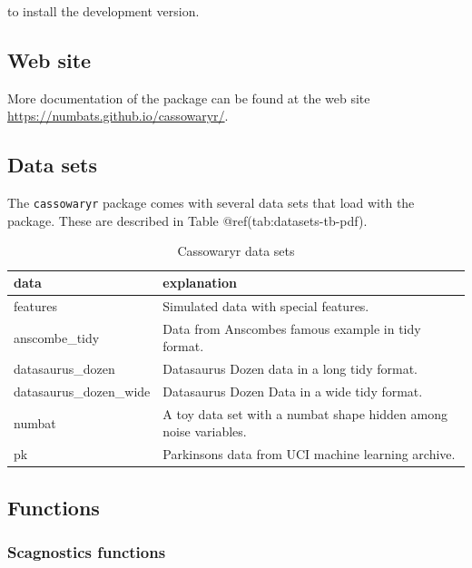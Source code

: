 to install the development version.

\hypertarget{web-site}{%
\subsection{Web site}\label{web-site}}

More documentation of the package can be found at the web site
\url{https://numbats.github.io/cassowaryr/}.

\hypertarget{data-sets}{%
\subsection{Data sets}\label{data-sets}}

The \texttt{cassowaryr} package comes with several data sets that load
with the package. These are described in Table
@ref(tab:datasets-tb-pdf).

\begin{Schunk}
\begin{table}

\caption{\label{tab:datasets-tb-pdf}Cassowaryr data sets}
\centering
\begin{tabular}[t]{>{\raggedright\arraybackslash}p{4cm}>{\raggedright\arraybackslash}p{8cm}}
\toprule
data & explanation\\
\midrule
features & Simulated data with special features.\\
anscombe\_tidy & Data from Anscombes famous example in tidy format.\\
datasaurus\_dozen & Datasaurus Dozen data in a long tidy format.\\
datasaurus\_dozen\_wide & Datasaurus Dozen Data in a wide tidy format.\\
numbat & A toy data set with a numbat shape hidden among noise variables.\\
\addlinespace
pk & Parkinsons data from UCI machine learning archive.\\
\bottomrule
\end{tabular}
\end{table}

\end{Schunk}

\hypertarget{functions}{%
\subsection{Functions}\label{functions}}

\hypertarget{scagnostics-functions}{%
\subsubsection{Scagnostics functions}\label{scagnostics-functions}}

